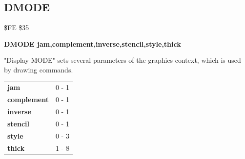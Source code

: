 \subsection{DMODE}
\begin{description}[leftmargin=2cm,style=nextline]
\item [Token:] \$FE \$35
\item [Format:] {\bf DMODE jam,complement,inverse,stencil,style,thick}
\item [Usage:]
   "Display MODE" sets several parameters of the graphics context, which is used by drawing commands.

\begin{center}
\ttfamily
\begin{tabular}{|l|l|}
\hline
   {\bf jam}        &  0 - 1 \\
   {\bf complement} &  0 - 1 \\
   {\bf inverse}    &  0 - 1 \\
   {\bf stencil}    &  0 - 1 \\
   {\bf style}      &  0 - 3 \\
   {\bf thick}      &  1 - 8 \\
\hline
\end{tabular}
\end{center}
\end{description}


\newpage
